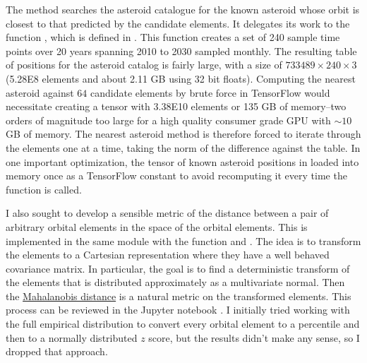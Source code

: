 The method  searches the asteroid catalogue for the known asteroid whose orbit is closest to that predicted by the candidate elements.
It delegates its work to the function , which is defined in .
This function creates a set of 240 sample time points over 20 years spanning 2010 to 2030 sampled monthly.
The resulting table of positions for the asteroid catalog is fairly large, with a size of $733489 \times 240 \times 3$ (5.28E8 elements and about 2.11 GB using 32 bit floats).
Computing the nearest asteroid against $64$ candidate elements by brute force in TensorFlow would necessitate creating a tensor with 3.38E10 elements
or 135 GB of memory--two orders of magnitude too large for a high quality consumer grade GPU with $\sim 10$ GB of memory.
The nearest asteroid method is therefore forced to iterate through the elements one at a time, taking the norm of the difference against the table.
In one important optimization, the tensor of known asteroid positions in loaded into memory 
once as a TensorFlow constant to avoid recomputing it every time the function is called.

I also sought to develop a sensible metric of the distance between a pair of arbitrary orbital elements in the space of the orbital elements.
This is implemented in the same module with the function  and .
The idea is to transform the elements to a Cartesian representation where they have a well behaved covariance matrix.
In particular, the goal is to find a deterministic transform of the elements that is distributed approximately as a multivariate normal.
Then the \href{https://en.wikipedia.org/wiki/Mahalanobis_distance}{Mahalanobis distance} is a natural metric on the transformed elements.
This process can be reviewed in the Jupyter notebook .
I initially tried working with the full empirical distribution to convert every orbital element to a percentile and then to a normally distributed $z$ score,
but the results didn't make any sense, so I dropped that approach.

